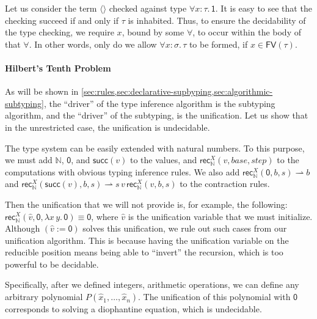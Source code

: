 \documentclass[a4,natbib=false]{article}
\newcommand{\fun}[2]{\lambda {#1}.\,{#2}}
\newcommand{\unit}{\langle\rangle}
\newcommand{\unittype}{\mathsf{1}}
\newcommand{\foralltype}[2]{\forall {#1}.\,#2}
\newcommand{\evarassign}[2]{({#1} \mathsf{:=} {#2})}
\newcommand{\contracts}[2]{{#1} \rightharpoonup {#2}}
\newcommand{\nattype}{\mathbb{N}}
\newcommand{\natzero}{\mathsf{0}}
\newcommand{\natsucc}[1]{\mathsf{succ}({#1})}
\newcommand{\recnat}[4]{\mathsf{rec}_{\nattype}^{#2}({#1},{#3},{#4})}
\newcommand{\fv}[1]{\mathsf{FV}(#1)}
\begin{document}
Let us consider the term $\unit$ checked against type $\foralltype{x : \tau}{\unittype}$.
It is easy to see that the checking succeed if and only if $\tau$ is inhabited.
Thus, to ensure the decidability of the type checking, we require $x$, bound by 
some $\forall$, to occur within the body of that $\forall$. In other words, 
only do we allow $\foralltype{x:\sigma}{\tau}$ to be formed, if
$x \in \fv{\tau}$.



\paragraph{Hilbert's Tenth Problem}

As will be shown in
\cref{sec:rules,sec:declarative-supbyping,sec:algorithmic-subtyping},
the ``driver'' of the type inference algorithm is the subtyping algorithm, and
the ``driver'' of the subtyping, is the unification. Let us show that in the
unrestricted case, the unification is undecidable.

The type system can be easily extended with natural numbers. To this purpose, we
must add $\nattype$, $\natzero$, and $\natsucc{v}$ to the values, and
$\recnat{v}{X}{base}{step}$ to the computations with obvious typing inference
rules.
We also add $\contracts{\recnat{\natzero}{X}{b}{s}}{b}$ and
$\contracts{\recnat{\natsucc{v}}{X}{b}{s}}{s \, v \, \recnat{v}{X}{b}{s}}$ to the contraction rules.

Then the unification that we will not provide is, for example, the following:
$\recnat{\hat{v}}{X}{\natzero}{\fun{x\,y}{\natzero}} \equiv \natzero$, where
$\hat{v}$ is the unification variable that we must initialize.
Although $\evarassign{\hat{v}}{\natzero}$ solves this unification,
we rule out such cases from our unification algorithm.
This is because having the unification variable on the reducible position
means being able to ``invert'' the recursion, which is too powerful to be decidable.

Specifically, after we defined integers,
arithmetic operations, we can define any arbitrary polynomial 
$P(\hat{x}_1, \dots, \hat{x}_n)$.
The unification of this polynomial with $\natzero$
corresponds to solving a diophantine equation, which is undecidable.
\end{document}
